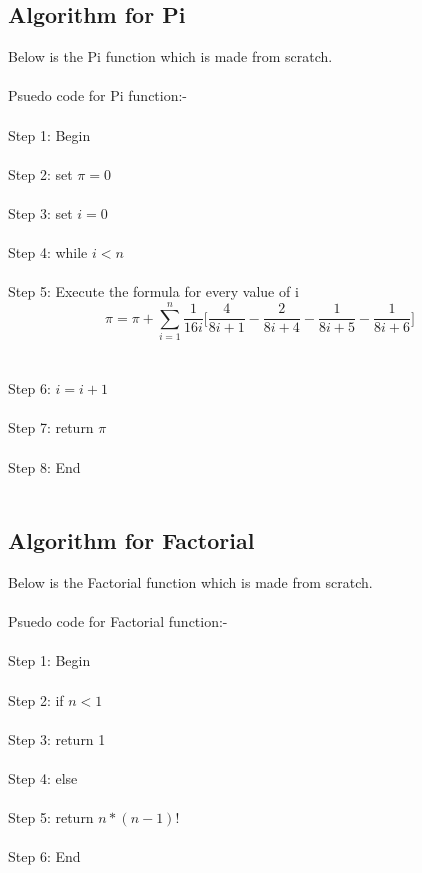 \documentclass[11pt]{article}
\begin{document}
	\subsection{Algorithm for Pi}
		Below is the Pi function which is made from scratch.\\\\
		Psuedo code for Pi function:-\\\\
		Step 1: Begin\\\\
		Step 2: set $\pi=0$\\\\ 
		Step 3: set $i=0$\\\\
		Step 4: while $i < n$\\\\
		Step 5: Execute the formula for every value of i $$\pi = \pi + \sum_{i=1}^{n} \frac{1}{16i} \lbrack \frac{4}{8i+1} - \frac{2}{8i+4} - \frac{1}{8i+5} - \frac{1}{8i+6} \rbrack $$\\\\ 
		Step 6: $i=i+1$\\\\
		Step 7: return $\pi$\\\\
		Step 8: End\\\\
		
	\subsection{Algorithm for Factorial}
		Below is the Factorial function which is made from scratch.\\\\
		Psuedo code for Factorial function:-\\\\
		Step 1: Begin\\\\
		Step 2: if $n<1$\\\\ 
		Step 3: return 1\\\\
		Step 4: else\\\\
		Step 5: return $n*(n-1)!$\\\\ 
		Step 6: End\\\\
	
\end{document}
